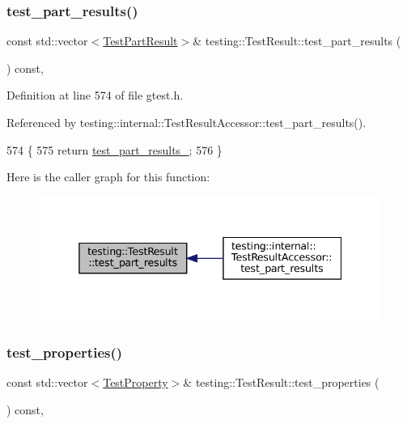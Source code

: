 \subsubsection{\texorpdfstring{test\+\_\+part\+\_\+results()}{test\_part\_results()}}
{\footnotesize\ttfamily const std\+::vector$<$\hyperlink{classtesting_1_1TestPartResult}{Test\+Part\+Result}$>$\& testing\+::\+Test\+Result\+::test\+\_\+part\+\_\+results (\begin{DoxyParamCaption}{ }\end{DoxyParamCaption}) const\hspace{0.3cm}{\ttfamily [inline]}, {\ttfamily [private]}}



Definition at line 574 of file gtest.\+h.



Referenced by testing\+::internal\+::\+Test\+Result\+Accessor\+::test\+\_\+part\+\_\+results().


\begin{DoxyCode}
574                                                              \{
575     \textcolor{keywordflow}{return} \hyperlink{classtesting_1_1TestResult_af17c00fae1435d344b318eb6bbb56cff}{test\_part\_results\_};
576   \}
\end{DoxyCode}
Here is the caller graph for this function\+:
\nopagebreak
\begin{figure}[H]
\begin{center}
\leavevmode
\includegraphics[width=338pt]{classtesting_1_1TestResult_a2964c3a12ef6ef9bcb47599374514432_icgraph}
\end{center}
\end{figure}
\mbox{\label{classtesting_1_1TestResult_a8c94e8e89c616abe5d33024a6b54f218}} 
\subsubsection{\texorpdfstring{test\+\_\+properties()}{test\_properties()}}
{\footnotesize\ttfamily const std\+::vector$<$\hyperlink{classtesting_1_1TestProperty}{Test\+Property}$>$\& testing\+::\+Test\+Result\+::test\+\_\+properties (\begin{DoxyParamCaption}{ }\end{DoxyParamCaption}) const\hspace{0.3cm}{\ttfamily [inline]}, {\ttfamily [private]}}



